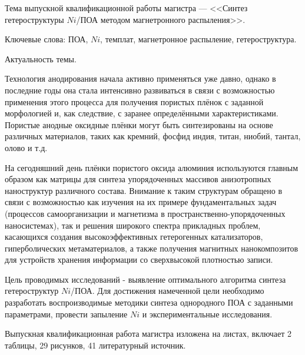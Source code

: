 
Тема выпускной квалификационной работы магистра --- <<Синтез гетероструктуры $Ni$/ПОА методом магнетронного распыления>>.

Ключевые слова: ПОА, $Ni$, темплат, магнетронное распыление, гетероструктура.

Актуальность темы.

Технология анодирования начала активно применяться уже давно, однако в последние годы она стала интенсивно развиваться в связи с возможностью применения этого процесса для получения пористых плёнок с заданной морфологией и, как следствие, с заранее определёнными характеристиками. Пористые анодные оксидные плёнки могут быть синтезированы на основе различных материалов, таких как кремний, фосфид индия, титан, ниобий, тантал, олово и т.д.

На сегодняшний день плёнки пористого оксида алюминия используются главным образом как матрицы для синтеза упорядоченных массивов анизотропных наноструктур различного состава. Внимание к таким структурам обращено в связи с возможностью как изучения на их примере фундаментальных задач (процессов самоорганизации и магнетизма в пространственно-упорядоченных наносистемах), так и решения широкого спектра прикладных проблем, касающихся создания высокоэффективных гетерогенных катализаторов, гиперболических метаматериалов, а также получения магнитных нанокомпозитов для устройств хранения информации со сверхвысокой плотностью записи.

Цель проводимых исследований - выявление оптимального алгоритма синтеза гетероструктур $Ni$/ПОА.
Для достижения намеченной цели необходимо разработать воспроизводимые методики синтеза однородного ПОА с заданными параметрами, провести запыление $Ni$ и экспериментальные исследования.

Выпускная квалификационная работа магистра изложена на \pageref{LastPage} листах, включает 2 таблицы, 29 рисунков, 41 литературный источник.

\clearpage
